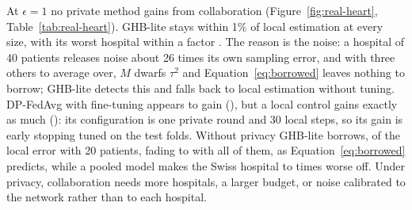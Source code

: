 At $\epsilon=1$ no private method gains from collaboration (Figure~\ref{fig:real-heart}, Table~\ref{tab:real-heart}). GHB-lite stays within 1\% of local estimation at every size, with its worst hospital within a factor \SimRealHeartGHBWorstMaxOne. The reason is the noise: a hospital of 40 patients releases noise about 26 times its own sampling error, and with three others to average over, $M$ dwarfs $\tau^2$ and Equation~\eqref{eq:borrowed} leaves nothing to borrow; GHB-lite detects this and falls back to local estimation without tuning. DP-FedAvg with fine-tuning appears to gain (\SimRealHeartTwentyFTRel), but a local control gains exactly as much (\SimRealHeartTwentyLGDRel): its configuration is one private round and 30 local steps, so its gain is early stopping tuned on the test folds. Without privacy GHB-lite borrows, \SimRealHeartTwentyGHBNoDPRel{} of the local error with 20 patients, fading to \SimRealHeartAllGHBNoDPRel{} with all of them, as Equation~\eqref{eq:borrowed} predicts, while a pooled model makes the Swiss hospital \SimRealHeartGlobalWorstMin{} to \SimRealHeartGlobalWorstMax{} times worse off. Under privacy, collaboration needs more hospitals, a larger budget, or noise calibrated to the network rather than to each hospital.

